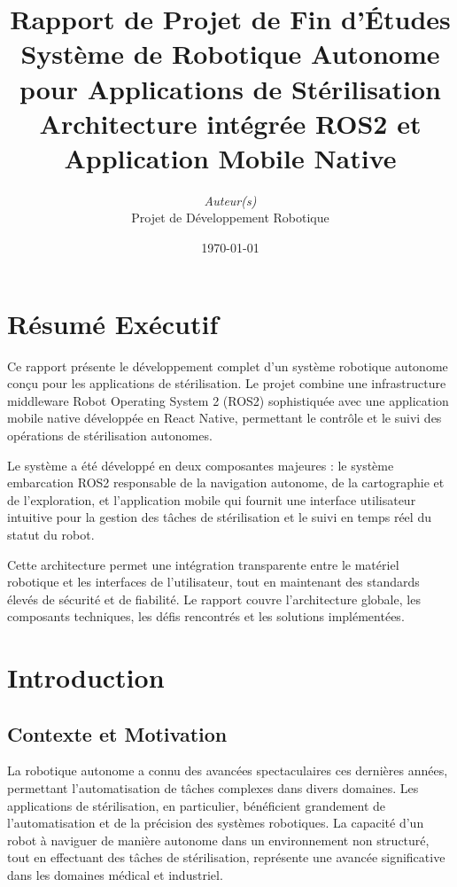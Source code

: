 \documentclass[12pt,a4paper,oneside]{report}
\title{%
  \Large \textbf{Rapport de Projet de Fin d'Études}\\[2cm]
  Système de Robotique Autonome pour Applications de Stérilisation\\[1cm]
  \normalsize Architecture intégrée ROS2 et Application Mobile Native
}
\author{%
  \textit{Auteur(s)}\\[0.5cm]
  Projet de Développement Robotique
}
\date{\today}
\begin{document}
\maketitle

\newpage
\tableofcontents
\newpage

\chapter*{Résumé Exécutif}

Ce rapport présente le développement complet d'un système robotique autonome conçu pour les applications de stérilisation. Le projet combine une infrastructure middleware Robot Operating System 2 (ROS2) sophistiquée avec une application mobile native développée en React Native, permettant le contrôle et le suivi des opérations de stérilisation autonomes.

Le système a été développé en deux composantes majeures : le système embarcation ROS2 responsable de la navigation autonome, de la cartographie et de l'exploration, et l'application mobile qui fournit une interface utilisateur intuitive pour la gestion des tâches de stérilisation et le suivi en temps réel du statut du robot.

Cette architecture permet une intégration transparente entre le matériel robotique et les interfaces de l'utilisateur, tout en maintenant des standards élevés de sécurité et de fiabilité. Le rapport couvre l'architecture globale, les composants techniques, les défis rencontrés et les solutions implémentées.

\newpage

\chapter{Introduction}

\section{Contexte et Motivation}

La robotique autonome a connu des avancées spectaculaires ces dernières années, permettant l'automatisation de tâches complexes dans divers domaines. Les applications de stérilisation, en particulier, bénéficient grandement de l'automatisation et de la précision des systèmes robotiques. La capacité d'un robot à naviguer de manière autonome dans un environnement non structuré, tout en effectuant des tâches de stérilisation, représente une avancée significative dans les domaines médical et industriel.
\end{document}

